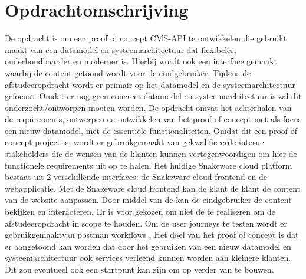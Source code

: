 \section{Opdrachtomschrijving}
De opdracht is om een proof of concept \gls{CMS}-API te ontwikkelen die gebruikt maakt van een datamodel en systeemarchitectuur dat flexibeler, onderhoudbaarder en moderner is.
Hierbij wordt ook een interface gemaakt waarbij de content getoond wordt voor de eindgebruiker.
Tijdens de afstudeeropdracht wordt er primair op het datamodel en de systeemarchitectuur gefocust.
Omdat er nog geen concreet datamodel en systeemarchitectuur is zal dit onderzocht/ontworpen moeten worden.
\whitespace
De opdracht omvat het achterhalen van de requirements, ontwerpen en ontwikkelen van het proof of concept met als focus een nieuw datamodel, met de essentiële functionaliteiten.
Omdat dit een proof of concept project is, wordt er gebruikgemaakt van gekwalificeerde interne stakeholders die de wensen van de klanten kunnen vertegenwoordigen om hier de functionele requirements uit op te halen.
\whitespace
Het huidige Snakeware cloud platform bestaat uit 2 verschillende interfaces: de Snakeware cloud frontend en de webapplicatie.
Met de Snakeware cloud frontend kan de klant de klant de content van de website aanpassen.
Door middel van de  kan de eindgebruiker de content bekijken en interacteren.
Er is voor gekozen om niet de  te realiseren om de afstudeeropdracht in scope te houden.
Om de user journeys te testen wordt er gebruikgemaaktvan postman workflows \Parencite{PostmanWorkflows}.
\whitespace
Het doel van het proof of concept is dat er aangetoond kan worden dat door het gebruiken van een nieuw datamodel en systeemarchitectuur ook services verleend kunnen worden aan kleinere klanten.
Dit zou eventueel ook een startpunt kan zijn om op verder van te bouwen.

